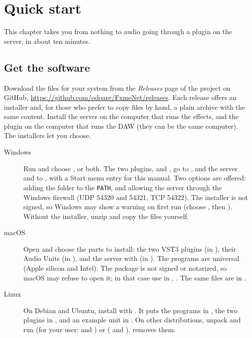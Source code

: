 \chapter{Quick start}
\label{ch:quickstart}

This chapter takes you from nothing to audio going through a plugin on the
server, in about ten minutes.

\section{Get the software}
\label{sec:download}

Download the files for your system from the \emph{Releases} page of the
project on GitHub, \url{https://github.com/odoare/FxmeNet/releases}. Each release
offers an installer and, for those who prefer to copy files by hand, a plain
archive with the same content. Install the server on the computer that runs
the effects, and the plugin on the computer that runs the DAW (they can be the
same computer). The installers let you choose.

\begin{description}
  \item[Windows] Run  and
    choose ,  or both. The two plugins,
     and , go to
    , and the server and
     to , with a Start menu
    entry for this manual. Two options are offered: adding the folder to the
    \texttt{PATH}, and allowing the server through the Windows firewall (UDP
    54320 and 54321, TCP 54322). The installer is not signed, so Windows may
    show a warning on first run (choose , then ).
    Without the installer, unzip
     and copy the files
    yourself.
  \item[macOS] Open  and choose the
    parts to install: the two VST3 plugins (in
    ), their Audio Units (in
    ), and the server with  (in
    ). The programs are universal (Apple silicon and
    Intel). The package is not signed or notarized, so macOS may refuse to
    open it; in that case use  in ,
    . The same files are in
    .
  \item[Linux] On Debian and Ubuntu, install
     with
    . It puts the programs in
    , the two plugins in , and an example
     unit in . On other
    distributions, unpack
     and run
     (for your user:  and
    ) or 
    ( and ).  removes them.
\end{description}

